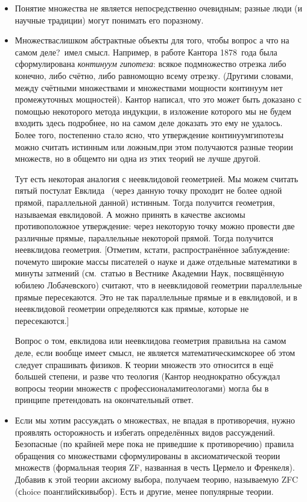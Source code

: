 \begin{itemize}
\item
Понятие множества не является непосредственно очевидным;
разные люди (и научные традиции) могут понимать его по\д разному.
\item
Множества\т слишком абстрактные объекты для того, чтобы
вопрос  а что на самом деле?\ имел смысл. Например,
        \label{continuum-hypothesis}%
в работе Кантора 1878~года была сформулирована \emph{континуум\д
гипотеза}: всякое подмножество отрезка либо конечно, либо
счётно, либо равномощно всему отрезку. (Другими словами,
между счётными множествами и множествами
мощности континуум нет промежуточных мощностей). Кантор написал, что это
может быть доказано  с помощью некоторого метода индукции, в
изложение которого мы не будем входить здесь подробнее, но на
самом деле доказать это ему не удалось. Более того, постепенно
стало ясно, что утверждение континуум\д гипотезы можно считать
истинным или ложным,\т при этом получаются разные теории
множеств, но в общем\д то ни одна из этих теорий не лучше
другой.

Тут есть некоторая аналогия с неевклидовой геометрией. Мы можем
считать  пятый постулат Евклида%
\ (через данную точку
проходит не более одной прямой, параллельной данной) истинным.
Тогда получится геометрия, называемая евклидовой. А можно
принять в качестве аксиомы противоположное утверждение: через
некоторую точку можно провести две различные прямые,
параллельные некоторой прямой. Тогда получится неевклидова
геометрия. [Отметим, кстати, распространённое заблуждение:
почему\д то широкие массы писателей о науке и даже отдельные
математики в минуты затмений (см.~статью в Вестнике Академии Наук,
посвящённую юбилею Лобачевского) считают, что в
неевклидовой геометрии параллельные
прямые пересекаются. Это не так\т
параллельные прямые и в евклидовой, и в неевклидовой геометрии
определяются как прямые, которые не пересекаются.]

Вопрос о том, евклидова или неевклидова геометрия правильна 
на самом деле, если вообще имеет смысл, не является
математическим\т скорее об этом следует спрашивать физиков.
К теории множеств это относится в ещё
большей степени, и разве что теология (Кантор
неоднократно обсуждал вопросы теории множеств с
профессионалами\д теологами) могла бы в принципе претендовать на
окончательный ответ.

\item
Если мы хотим рассуждать о множествах, не впадая в противоречия,
нужно проявлять осторожность и избегать определённых видов
рассуждений. Безопасные (по крайней мере пока не приведшие к
противоречию) правила обращения со множествами сформулированы в
аксиоматической теории множеств (формальная теория ZF,
названная
в честь Цермело и
Френкеля).
Добавив к этой теории аксиому
выбора, получаем теорию, называемую ZFC
(сhoice по\д английски\т выбор). Есть и другие, менее популярные теории.
\end{itemize}

